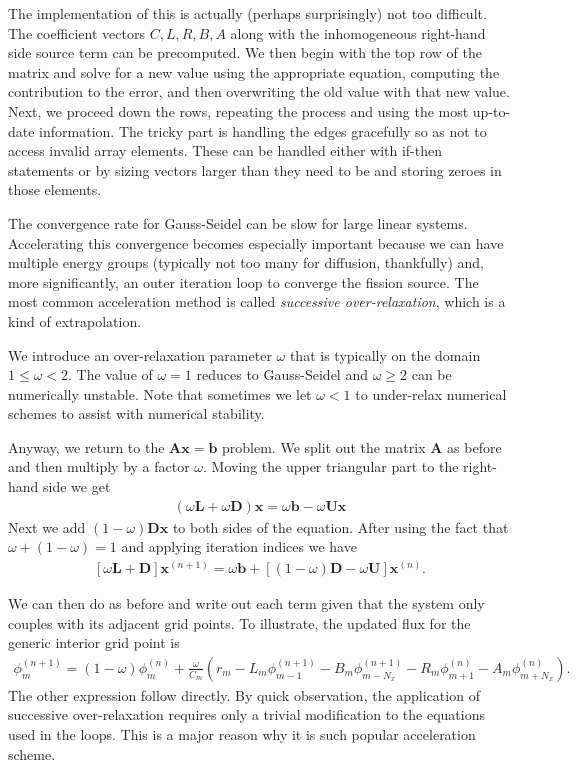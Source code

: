 The implementation of this is actually (perhaps surprisingly) not too difficult. The coefficient vectors $C, L, R, B, A$ along with the inhomogeneous right-hand side source term can be precomputed. We then begin with the top row of the matrix and solve for a new value using the appropriate equation, computing the contribution to the error, and then overwriting the old value with that new value. Next, we proceed down the rows, repeating the process and using the most up-to-date information. The tricky part is handling the edges gracefully so as not to access invalid array elements. These can be handled either with if-then statements or by sizing vectors larger than they need to be and storing zeroes in those elements.

The convergence rate for Gauss-Seidel can be slow for large linear systems. Accelerating this convergence becomes especially important because we can have multiple energy groups (typically not too many for diffusion, thankfully) and, more significantly, an outer iteration loop to converge the fission source. The most common acceleration method is called \emph{successive over-relaxation}, which is a kind of extrapolation.

We introduce an over-relaxation parameter $\omega$ that is typically on the domain $1 \le \omega < 2$. The value of $\omega = 1$ reduces to Gauss-Seidel and $\omega \ge 2$ can be numerically unstable. Note that sometimes we let $\omega < 1$ to under-relax numerical schemes to assist with numerical stability. 

Anyway, we return to the $\mathbf{Ax} = \mathbf{b}$ problem. We split out the matrix $\mathbf{A}$ as before and then multiply by a factor $\omega$. Moving the upper triangular part to the right-hand side we get
\begin{align}
   \left( \omega \mathbf{L} + \omega  \mathbf{D} \right) \mathbf{x} = \omega \mathbf{b} - \omega \mathbf{U x }
\end{align}
Next we add $( 1 - \omega ) \mathbf{D x}$ to both sides of the equation. After using the fact that $\omega + ( 1 - \omega ) = 1$ and applying iteration indices we have
\begin{align}
   \left[ \omega \mathbf{L} + \mathbf{D} \right] \mathbf{x}^{(n+1)} = \omega  \mathbf{b} + \left[ ( 1 - \omega ) \mathbf{D} - \omega \mathbf{U} \right] \mathbf{ x }^{(n)} .
\end{align}

We can then do as before and write out each term given that the system only couples with its adjacent grid points. To illustrate, the updated flux for the generic interior grid point is
\begin{align}
  \phi_m^{(n+1)} = ( 1 - \omega ) \phi_m^{(n)} +  \frac{\omega}{C_m} \left( r_m - L_m \phi_{m-1}^{(n+1)} - B_m \phi_{m-N_x}^{(n+1)} - R_{m} \phi_{m+1}^{(n)} - A_{m} \phi_{m+N_x}^{(n)} \right) .
\end{align}
The other expression follow directly. By quick observation, the application of successive over-relaxation requires only a trivial modification to the equations used in the loops. This is a major reason why it is such popular acceleration scheme.


